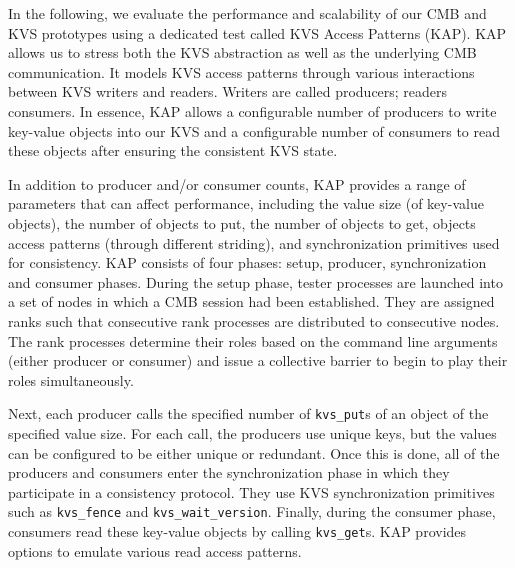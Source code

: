 In the following, we evaluate the performance and scalability
of our CMB and KVS prototypes
using
a dedicated test called KVS Access Patterns (KAP).
KAP allows us to stress both the KVS abstraction 
as well as the underlying CMB communication.
It models KVS access patterns through various interactions
between KVS writers and readers. Writers are called producers;
readers consumers.
In essence, KAP allows a configurable number of producers
to write key-value objects into our KVS 
and a configurable number of consumers to read these
objects after ensuring the consistent KVS state.

In addition to producer and/or consumer counts,
KAP provides a range of parameters that can affect performance, including
the value size (of key-value objects),
the number of objects to put,
the number of objects to get, objects access 
patterns (through different striding), and
synchronization primitives used for consistency.
KAP consists of four phases: setup, producer, synchronization 
and consumer phases. 
During the setup phase, tester processes are launched 
into a set of nodes in which a CMB session had been established.
They are assigned ranks such that consecutive rank
processes are distributed to consecutive nodes.
The rank processes determine their roles based
on the command line arguments (either producer or consumer) and issue a
\flux collective barrier to begin to play their roles
simultaneously.

Next, each producer calls the specified number of
{\tt kvs\_put}s of an object of the specified value size.
For each call, the producers use unique keys, but
the values can be configured to be either unique
or redundant.
Once this is done, all of the producers and consumers
enter the synchronization phase in which they 
participate in a consistency protocol. They use
KVS synchronization primitives such as {\tt kvs\_fence}
and {\tt kvs\_wait\_version}.
Finally, during the consumer phase, consumers read
these key-value objects by calling {\tt kvs\_get}s.
KAP provides options to emulate various read access
patterns.

